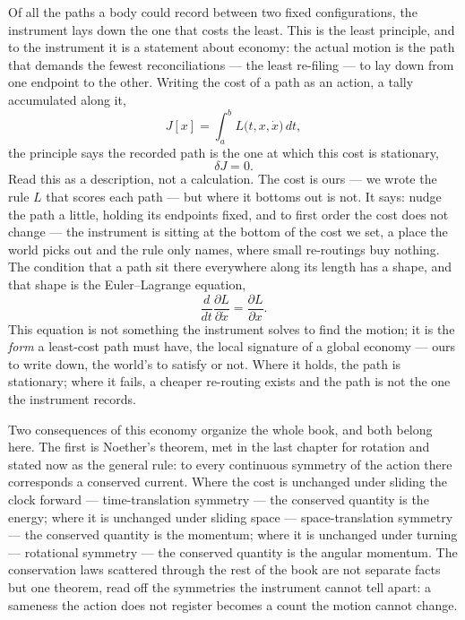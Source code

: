 Of all the paths a body could record between two fixed configurations, the instrument lays down the one that
costs the least. This is the least principle, and to the instrument it is a statement about economy: the
actual motion is the path that demands the fewest reconciliations --- the least re-filing --- to lay down
from one endpoint to the other. Writing the cost of a path as an action, a tally accumulated along it,
\begin{equation}
  J[x] = \int_a^b L\bigl(t, x, \dot{x}\bigr)\, dt,
\end{equation}
the principle says the recorded path is the one at which this cost is stationary,
\begin{equation}
  \delta J = 0 .
\end{equation}
Read this as a description, not a calculation. The cost is ours --- we wrote the rule $L$ that scores each
path --- but where it bottoms out is not. It says: nudge the path a little, holding its endpoints fixed, and to
first order the cost does not change --- the instrument is sitting at the bottom of the cost we set, a place
the world picks out and the rule only names, where small re-routings buy nothing. The condition that a path sit there everywhere along its length has a shape,
and that shape is the Euler--Lagrange equation,
\begin{equation}
  \frac{d}{dt}\frac{\partial L}{\partial \dot{x}} = \frac{\partial L}{\partial x} .
\end{equation}
This equation is not something the instrument solves to find the motion; it is the \emph{form} a least-cost
path must have, the local signature of a global economy --- ours to write down, the world's to satisfy or not.
Where it holds, the path is stationary; where it fails, a cheaper re-routing exists and the path is not the one
the instrument records.

Two consequences of this economy organize the whole book, and both belong here. The first is Noether's
theorem, met in the last chapter for rotation and stated now as the general rule: to every continuous symmetry
of the action there corresponds a conserved current. Where the cost is unchanged under sliding the clock
forward --- time-translation symmetry --- the conserved quantity is the energy; where it is unchanged under
sliding space --- space-translation symmetry --- the conserved quantity is the momentum; where it is unchanged
under turning --- rotational symmetry --- the conserved quantity is the angular momentum. The conservation
laws scattered through the rest of the book are not separate facts but one theorem, read off the symmetries
the instrument cannot tell apart: a sameness the action does not register becomes a count the motion cannot
change.

